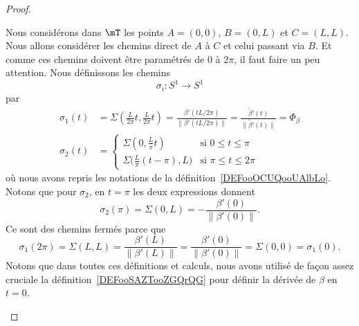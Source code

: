 \begin{proof}
\begin{subproof}
		Nous considérons dans \( \mT\) les points \( A=(0,0)\), \( B=(0,L)\) et \( C=(L,L)\). Nous allons considérer les chemins direct de \( A\) à \( C\) et celui passant via \( B\). Et comme ces chemins doivent être paramétrés de \( 0\) à \( 2 \pi\), il faut faire un peu attention. Nous définissons les chemins
		\begin{equation}
			\sigma_i\colon S^1\to S^1
		\end{equation}
		par
		\begin{subequations}
			\begin{align}
				\sigma_1(t) & =\Sigma\left( \frac{ L }{ 2\pi }t,\frac{ L }{ 2\pi }t \right)=\frac{ \beta'(tL/2\pi) }{ \| \beta'(tL/2\pi) \| }=\frac{ \tilde \beta'(t) }{ \|\tilde  \beta'(t) \| }=\Phi_{\beta} \\
				\sigma_2(t) & =\begin{cases}
					\Sigma(0,\frac{ L }{ \pi }t)                  & \text{si } 0\leq t\leq \pi   \\
					\Sigma\big( \frac{ L }{ \pi }(t-\pi),L  \big) & \text{si }\pi\leq t\leq 2\pi
				\end{cases}
			\end{align}
		\end{subequations}
		où nous avons repris les notations de la définition~\ref{DEFooOCUQooUAlbLo}. Notons que pour \( \sigma_2\), en \( t=\pi\) les deux expressions donnent
		\begin{equation}
			\sigma_2(\pi)=\Sigma(0,L)=-\frac{ \beta'(0) }{ \| \beta'(0) \| }.
		\end{equation}
		Ce sont des chemins fermés parce que
		\begin{equation}
			\sigma_1(2\pi)=\Sigma(L,L)=\frac{ \beta'(L) }{ \| \beta'(L) \| }=\frac{ \beta'(0) }{ \| \beta'(0) \| }=\Sigma(0,0)=\sigma_1(0).
		\end{equation}
		Notons que dans toutes ces définitions et calculs, nous avons utilisé de façon assez cruciale la définition~\ref{DEFooSAZTooZGQrQG} pour définir la dérivée de \( \beta\) en \( t=0\).


\end{subproof}
\end{proof}
